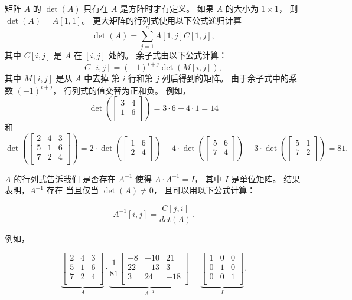 
矩阵 $A$ 的 $\det(A)$ 只有在
$A$ 是方阵时才有定义。
如果 $A$ 的大小为 $1 \times 1$，
则 $\det(A)=A[1,1]$。
更大矩阵的行列式使用以下公式递归计算 
\[\det(A)=\sum_{j=1}^n A[1,j] C[1,j],\]
其中 $C[i,j]$ 是 $A$ 在 $[i,j]$ 处的。
余子式由以下公式计算：
\[C[i,j] = (-1)^{i+j} \det(M[i,j]),\]
其中 $M[i,j]$ 是从 $A$ 中去掉
第 $i$ 行和第 $j$ 列后得到的矩阵。
由于余子式中的系数 $(-1)^{i+j}$，
行列式的值交替为正和负。
例如，
\[
\det(
 \begin{bmatrix}
  3 & 4 \\
  1 & 6 \\
 \end{bmatrix}
) = 3 \cdot 6 - 4 \cdot 1 = 14
\]
和
\[
\det(
 \begin{bmatrix}
  2 & 4 & 3 \\
  5 & 1 & 6 \\
  7 & 2 & 4 \\
 \end{bmatrix}
) =
2 \cdot
\det(
 \begin{bmatrix}
  1 & 6 \\
  2 & 4 \\
 \end{bmatrix}
)
-4 \cdot
\det(
 \begin{bmatrix}
  5 & 6 \\
  7 & 4 \\
 \end{bmatrix}
)
+3 \cdot
\det(
 \begin{bmatrix}
  5 & 1 \\
  7 & 2 \\
 \end{bmatrix}
) = 81.
\]


$A$ 的行列式告诉我们
是否存在
$A^{-1}$ 使得 $A \cdot A^{-1} = I$，
其中 $I$ 是单位矩阵。
结果表明，$A^{-1}$ 存在
当且仅当 $\det(A) \neq 0$，
且可以用以下公式计算：

\[A^{-1}[i,j] = \frac{C[j,i]}{det(A)}.\]

例如，

\[
\underbrace{
 \begin{bmatrix}
  2 & 4 & 3\\
  5 & 1 & 6\\
  7 & 2 & 4\\
 \end{bmatrix}
}_{A}
\cdot
\underbrace{
 \frac{1}{81}
 \begin{bmatrix}
   -8 & -10 & 21 \\
   22 & -13 & 3 \\
   3 & 24 & -18 \\
 \end{bmatrix}
}_{A^{-1}}
=
\underbrace{
 \begin{bmatrix}
  1 & 0 & 0 \\
  0 & 1 & 0 \\
  0 & 0 & 1 \\
 \end{bmatrix}
}_{I}.
\]

